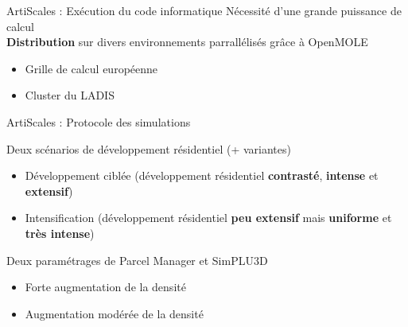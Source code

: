 \documentclass[xcolor=table]{beamer}
\begin{document}
\begin{frame}{ArtiScales : Exécution du code informatique} 
	Nécessité d'une grande puissance de calcul
\\
	\textbf{Distribution} sur divers environnements parrallélisés grâce à OpenMOLE
	\begin{itemize}
		\item Grille de calcul européenne
		\item Cluster du LADIS
	\end{itemize}
\end{frame}

\begin{frame}{ArtiScales : Protocole des simulations}
	\begin{block}{Deux scénarios de développement résidentiel (+ variantes)}
		\begin{itemize}
			\small
			\item Développement ciblée (développement résidentiel \textbf{contrasté}, \textbf{intense} et \textbf{extensif})
			\item Intensification (développement résidentiel \textbf{peu extensif} mais \textbf{uniforme} et \textbf{très intense})
		\end{itemize}
	\end{block}
	\begin{block}{Deux paramétrages de Parcel Manager et SimPLU3D}
	\begin{itemize}
		\small
		\item Forte augmentation de la densité
		\item Augmentation modérée de la densité
	\end{itemize}
	\end{block}
\end{frame}
\end{document}
